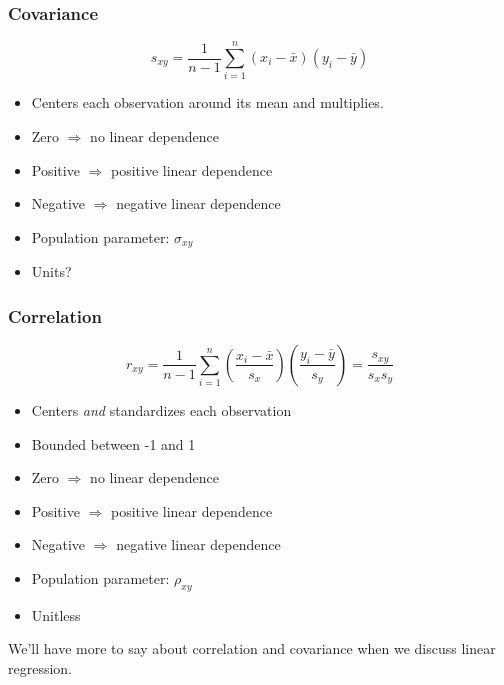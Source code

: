 \documentclass[handout]{beamer}
\begin{document}
\begin{frame}
\frametitle{Covariance}
	$$s_{xy} = \frac{1}{n-1} \sum_{i=1}^n (x_i -\bar{x})(y_i - \bar{y})$$

\begin{itemize}
	\item Centers each observation around its mean and multiplies.
	\item Zero $\Rightarrow$ no linear dependence
	\item Positive $\Rightarrow$ positive linear dependence
	\item Negative $\Rightarrow$ negative linear dependence
	\item Population parameter: $\sigma_{xy}$
	\item Units?
\end{itemize}
\end{frame}
\begin{frame}
\frametitle{Correlation}
	$$r_{xy} = \frac{1}{n-1} \sum_{i=1}^n \left(\frac{x_i -\bar{x}}{s_x}\right)\left(\frac{y_i - \bar{y}}{s_y}\right) = \frac{s_{xy}}{s_x s_y}$$

\begin{itemize}
	\item Centers \emph{and} standardizes each observation 
	\item Bounded between -1 and 1
	\item Zero $\Rightarrow$ no linear dependence
	\item Positive $\Rightarrow$ positive linear dependence
	\item Negative $\Rightarrow$ negative linear dependence
	\item Population parameter: $\rho_{xy}$
	\item Unitless
\end{itemize}
\end{frame}
\begin{frame}
\Large \alert{We'll have more to say about correlation and covariance when we discuss linear regression.}
\end{frame}
\end{document}
